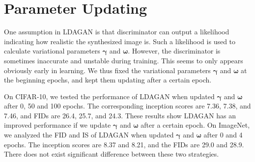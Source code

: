 \documentclass{article}
\begin{document}
\begin{table*}[h]
\caption{The performances of LDAGAN with various number of generators}
\centering
\small\addtolength{\tabcolsep}{-0pt}
\qquad
{}
\label{tab:NumGenerator}

\end{table*}



\section{Parameter Updating}
\label{App:ParUp}

One assumption in LDAGAN is that discriminator can output a likelihood indicating how realistic the synthesized image is.
Such a likelihood is used to calculate variational parameters $\bm{\gamma}$ and $\bm{\omega}$.
However, the discriminator is sometimes inaccurate and unstable during training.
This seems to only appears obviously early in learning.
We thus fixed the variational parameters $\bm{\gamma}$ and $\bm{\omega}$ at the beginning epochs, and kept them updating after a certain epoch.


On CIFAR-10, we tested the performance of LDAGAN when updated $\bm{\gamma}$ and $\bm{\omega}$ after 0, 50 and 100 epochs.
The corresponding inception scores are 7.36, 7.38, and 7.46, and FIDs are 26.4, 25.7, and 24.3.
These results show LDAGAN has an improved performance if we update $\bm{\gamma}$ and $\bm{\omega}$ after a certain epoch.
On ImageNet, we analyzed the FID and IS of LDAGAN when updated $\bm{\gamma}$ and $\bm{\omega}$ after 0 and 4 epochs.
The inception scores are 8.37 and 8.21, and the FIDs are 29.0 and 28.9.
There does not exist significant difference between these two strategies.
\end{document}
